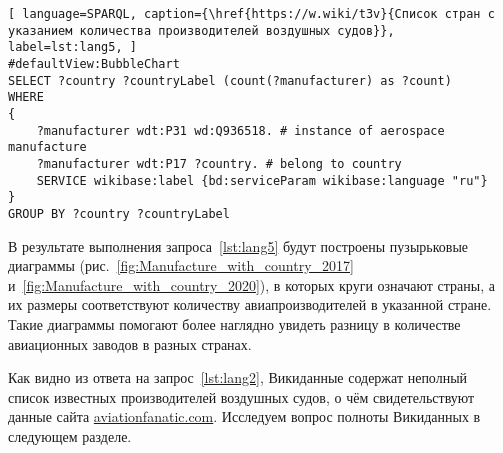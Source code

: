\begin{lstlisting}[ language=SPARQL, caption={\href{https://w.wiki/t3v}{Список стран с указанием количества производителей воздушных судов}}, label=lst:lang5, ]
#defaultView:BubbleChart
SELECT ?country ?countryLabel (count(?manufacturer) as ?count)
WHERE
{
    ?manufacturer wdt:P31 wd:Q936518. # instance of aerospace manufacture
  	?manufacturer wdt:P17 ?country. # belong to country
    SERVICE wikibase:label {bd:serviceParam wikibase:language "ru"}
}
GROUP BY ?country ?countryLabel
\end{lstlisting}

В результате выполнения запроса~\ref{lst:lang5} будут построены пузырьковые диаграммы 
(рис.~\ref{fig:Manufacture_with_country_2017} и~\ref{fig:Manufacture_with_country_2020}), 
в которых круги означают страны, 
а их размеры соответствуют количеству авиапроизводителей в указанной стране. 
Такие диаграммы помогают более наглядно увидеть разницу в количестве авиационных заводов в разных странах.


\label{aircraft_question_4}

Как видно из ответа на запрос~\ref{lst:lang2}, 
Викиданные содержат неполный список известных производителей воздушных судов, 
о чём свидетельствуют данные сайта \href{https://www.aviationfanatic.com/}{aviationfanatic.com}. 
Исследуем вопрос полноты Викиданных в следующем разделе. 


